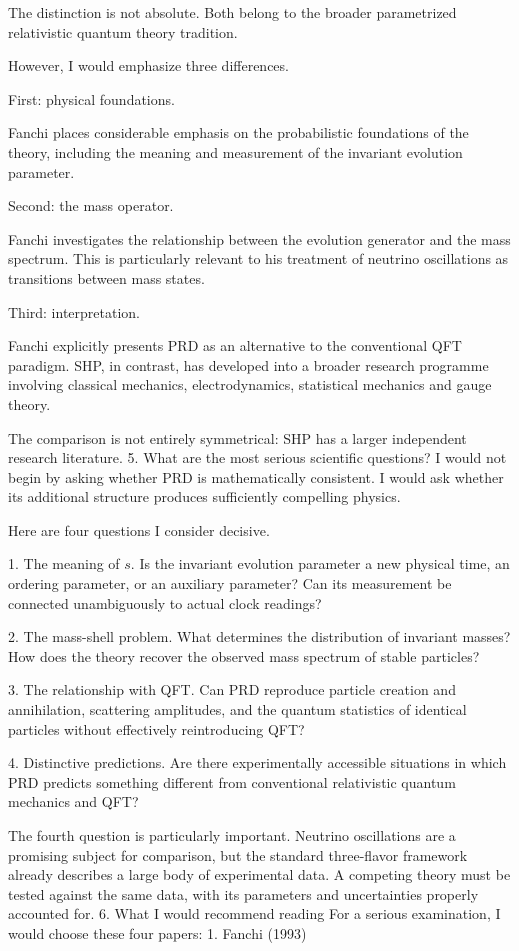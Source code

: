 The distinction is not absolute. Both belong to the broader parametrized relativistic quantum theory tradition.

However, I would emphasize three differences.

First: physical foundations.

Fanchi places considerable emphasis on the probabilistic foundations of the theory, including the meaning and measurement of the invariant evolution parameter.

Second: the mass operator.

Fanchi investigates the relationship between the evolution generator and the mass spectrum. This is particularly relevant to his treatment of neutrino oscillations as transitions between mass states.

Third: interpretation.

Fanchi explicitly presents PRD as an alternative to the conventional QFT paradigm. SHP, in contrast, has developed into a broader research programme involving classical mechanics, electrodynamics, statistical mechanics and gauge theory.

The comparison is not entirely symmetrical: SHP has a larger independent research literature.
5. What are the most serious scientific questions?
I would not begin by asking whether PRD is mathematically consistent. I would ask whether its additional structure produces sufficiently compelling physics.

Here are four questions I consider decisive.

1. The meaning of \(s\). Is the invariant evolution parameter a new physical time, an ordering parameter, or an auxiliary parameter? Can its measurement be connected unambiguously to actual clock readings?

2. The mass-shell problem. What determines the distribution of invariant masses? How does the theory recover the observed mass spectrum of stable particles?

3. The relationship with QFT. Can PRD reproduce particle creation and annihilation, scattering amplitudes, and the quantum statistics of identical particles without effectively reintroducing QFT?

4. Distinctive predictions. Are there experimentally accessible situations in which PRD predicts something different from conventional relativistic quantum mechanics and QFT?

The fourth question is particularly important. Neutrino oscillations are a promising subject for comparison, but the standard three-flavor framework already describes a large body of experimental data. A competing theory must be tested against the same data, with its parameters and uncertainties properly accounted for.
6. What I would recommend reading
For a serious examination, I would choose these four papers:
1. Fanchi (1993)


